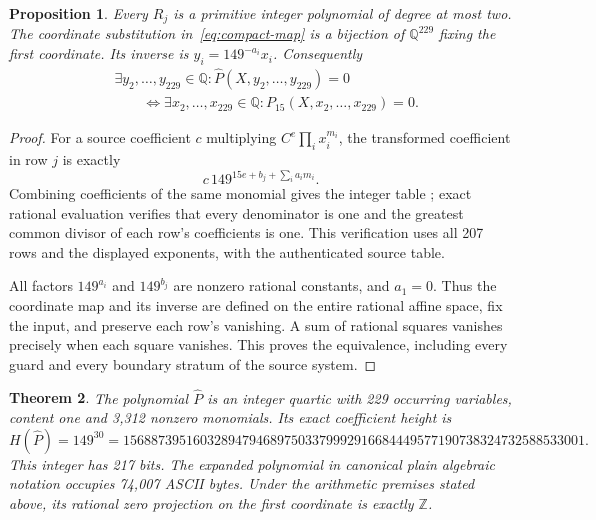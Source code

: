 \documentclass[11pt,a4paper]{article}
\newtheorem{theorem}{Theorem}[section]
\newtheorem{proposition}[theorem]{Proposition}
\newcommand{\Q}{\mathbb Q}\newcommand{\Z}{\mathbb Z}
\begin{document}
\begin{proposition}\label{prop:compact-map}
Every $R_j$ is a primitive integer polynomial of degree at most two.
The coordinate substitution in~\eqref{eq:compact-map} is a bijection
of $\Q^{229}$ fixing the first coordinate. Its inverse is
$y_i=149^{-a_i}x_i$. Consequently
\[
 \begin{aligned}
 &\exists y_2,\ldots,y_{229}\in\Q:\widehat P(X,y_2,\ldots,y_{229})=0\\
 &\qquad\Longleftrightarrow
 \exists x_2,\ldots,x_{229}\in\Q:P_{15}(X,x_2,\ldots,x_{229})=0.
 \end{aligned}
\]
\end{proposition}

\begin{proof}
For a source coefficient $c$ multiplying $C^e\prod_i x_i^{m_i}$,
the transformed coefficient in row $j$ is exactly
\[
 c\,149^{15e+b_j+\sum_i a_im_i}.
\]
Combining coefficients of the same monomial gives the integer table
; exact rational evaluation verifies that every
denominator is one and the greatest common divisor of each row's
coefficients is one. This verification uses all 207 rows and the
displayed exponents, with the authenticated source table.

All factors $149^{a_i}$ and $149^{b_j}$ are nonzero rational constants,
and $a_1=0$. Thus the coordinate map and its inverse are defined on
the entire rational affine space, fix the input, and preserve each
row's vanishing. A sum of rational squares vanishes precisely when
each square vanishes. This proves the equivalence, including every
guard and every boundary stratum of the source system.
\end{proof}

\begin{theorem}\label{thm:compact-coefficients}
The polynomial $\widehat P$ is an integer quartic with 229 occurring
variables, content one and 3,312 nonzero monomials. Its exact
coefficient height is
\[
 H(\widehat P)=149^{30}
 =156887395160328947946897503379992916684449577190738324732588533001.
\]
This integer has 217 bits. The expanded polynomial in canonical
plain algebraic notation occupies 74,007 ASCII bytes.
Under the arithmetic premises stated above, its rational zero
projection on the first coordinate is exactly $\Z$.
\end{theorem}
\end{document}

